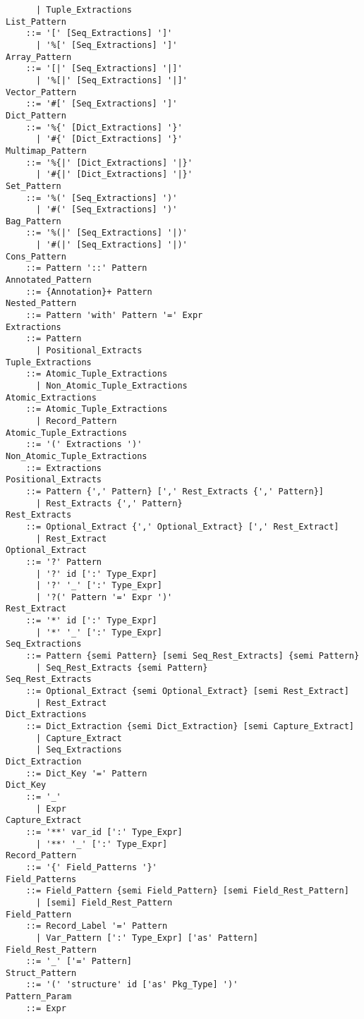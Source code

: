 \begin{lstlisting}
      | Tuple_Extractions
List_Pattern
    ::= '[' [Seq_Extractions] ']'
      | '%[' [Seq_Extractions] ']'
Array_Pattern
    ::= '[|' [Seq_Extractions] '|]'
      | '%[|' [Seq_Extractions] '|]'
Vector_Pattern
    ::= '#[' [Seq_Extractions] ']'
Dict_Pattern 
    ::= '%{' [Dict_Extractions] '}'
      | '#{' [Dict_Extractions] '}'
Multimap_Pattern 
    ::= '%{|' [Dict_Extractions] '|}'
      | '#{|' [Dict_Extractions] '|}'
Set_Pattern
    ::= '%(' [Seq_Extractions] ')'
      | '#(' [Seq_Extractions] ')'
Bag_Pattern
    ::= '%(|' [Seq_Extractions] '|)'
      | '#(|' [Seq_Extractions] '|)'
Cons_Pattern 
    ::= Pattern '::' Pattern
Annotated_Pattern 
    ::= {Annotation}+ Pattern
Nested_Pattern
    ::= Pattern 'with' Pattern '=' Expr
Extractions
    ::= Pattern 
      | Positional_Extracts
Tuple_Extractions 
    ::= Atomic_Tuple_Extractions
      | Non_Atomic_Tuple_Extractions
Atomic_Extractions
    ::= Atomic_Tuple_Extractions
      | Record_Pattern
Atomic_Tuple_Extractions 
    ::= '(' Extractions ')'
Non_Atomic_Tuple_Extractions 
    ::= Extractions
Positional_Extracts 
    ::= Pattern {',' Pattern} [',' Rest_Extracts {',' Pattern}]
      | Rest_Extracts {',' Pattern}
Rest_Extracts
    ::= Optional_Extract {',' Optional_Extract} [',' Rest_Extract]
      | Rest_Extract
Optional_Extract 
    ::= '?' Pattern
      | '?' id [':' Type_Expr]
      | '?' '_' [':' Type_Expr]
      | '?(' Pattern '=' Expr ')'
Rest_Extract 
    ::= '*' id [':' Type_Expr]
      | '*' '_' [':' Type_Expr]
Seq_Extractions
    ::= Pattern {semi Pattern} [semi Seq_Rest_Extracts] {semi Pattern}
      | Seq_Rest_Extracts {semi Pattern}
Seq_Rest_Extracts 
    ::= Optional_Extract {semi Optional_Extract} [semi Rest_Extract]
      | Rest_Extract
Dict_Extractions 
    ::= Dict_Extraction {semi Dict_Extraction} [semi Capture_Extract]
      | Capture_Extract
      | Seq_Extractions
Dict_Extraction
    ::= Dict_Key '=' Pattern
Dict_Key 
    ::= '_'
      | Expr
Capture_Extract 
    ::= '**' var_id [':' Type_Expr]
      | '**' '_' [':' Type_Expr]
Record_Pattern 
    ::= '{' Field_Patterns '}'
Field_Patterns 
    ::= Field_Pattern {semi Field_Pattern} [semi Field_Rest_Pattern]
      | [semi] Field_Rest_Pattern
Field_Pattern 
    ::= Record_Label '=' Pattern
      | Var_Pattern [':' Type_Expr] ['as' Pattern]
Field_Rest_Pattern
    ::= '_' ['=' Pattern]
Struct_Pattern
    ::= '(' 'structure' id ['as' Pkg_Type] ')'
Pattern_Param 
    ::= Expr
\end{lstlisting}

